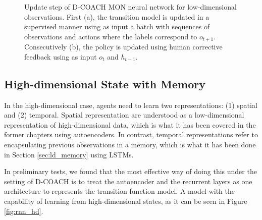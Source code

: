 \begin{figure}[h]
\centering
{}
\caption[Update step of D-COACH MON neural network for low-dimensional observations.]{Update step of D-COACH MON neural network for low-dimensional observations. First (a), the transition model is updated in a supervised manner using as input a batch with sequences of observations and actions where the labels correspond to $o_{t+1}$. Consecutively (b), the policy is updated using human corrective feedback using as input $o_{t}$ and $h_{t-1}$.} 
\label{fig:ld_mon_train} 
\end{figure}

\subsection{High-dimensional State with Memory}
In the high-dimensional case, agents need to learn two representations: (1) spatial and (2) temporal. Spatial representation are understood as a low-dimensional representation of high-dimensional data, which is what it has been covered in the former chapters using autoencoders. In contrast, temporal representations refer to encapsulating previous observations in a memory, which is what it has been done in Section \ref{sec:ld_memory} using LSTMs. 

In preliminary tests, we found that the most effective way of doing this under the setting of D-COACH is to treat the autoencoder and the recurrent layers as one architecture to represents the transition function model. A model with the capability of learning from high-dimensional states, as it can be seen in Figure \ref{fig:rnn_hd}. 


